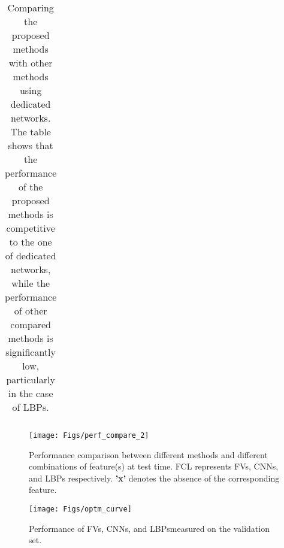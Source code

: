 \documentclass{sig-alternate-05-2015}
\begin{document}
\begin{table*}[tb]
\begin{tabular}{|K|C|C|C|C|C| }
  \hline 
\end{tabular}
\caption{ Comparing the proposed methods with other methods using dedicated networks. The table shows that the performance of the proposed methods is competitive to the one of dedicated networks, while the performance of other compared methods is significantly low, particularly in the case of LBPs.  } 
\label{tab:compare_with_dedicated_network}
\end{table*}\begin{figure}[tb]
\centering
\texttt{[image: Figs/perf\_compare\_2]} 
\vspace{-1em}
\caption{
  Performance comparison between different methods and different combinations of feature(s) at test time. FCL represents FVs, CNNs, and LBPs respectively. \textbf{'x'} denotes the absence of the  corresponding feature.
}
\label{fig:perf_compare}
\end{figure}\begin{figure}[t]
\centering
\texttt{[image: Figs/optm\_curve]}
\vspace{-1em}
\caption{
  Performance of FVs, CNNs, and LBPsmeasured on the validation set.
}
\label{fig:optm_curve}
\end{figure}
\end{document}
